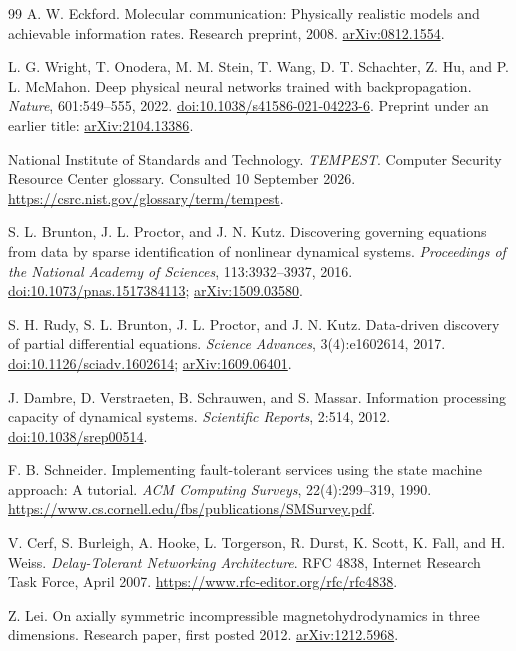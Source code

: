 \documentclass[11pt,a4paper]{article}
\theoremstyle{definition}
\theoremstyle{remark}
\begin{document}
\begin{thebibliography}{99}
A. W. Eckford. Molecular communication: Physically realistic models and achievable information rates. Research preprint, 2008. \href{https://arxiv.org/abs/0812.1554}{arXiv:0812.1554}.

L. G. Wright, T. Onodera, M. M. Stein, T. Wang, D. T. Schachter, Z. Hu, and P. L. McMahon. Deep physical neural networks trained with backpropagation. \emph{Nature}, 601:549--555, 2022. \href{https://doi.org/10.1038/s41586-021-04223-6}{doi:10.1038/s41586-021-04223-6}. Preprint under an earlier title: \href{https://arxiv.org/abs/2104.13386}{arXiv:2104.13386}.

National Institute of Standards and Technology. \emph{TEMPEST}. Computer Security Resource Center glossary. Consulted 10 September 2026. \url{https://csrc.nist.gov/glossary/term/tempest}.

S. L. Brunton, J. L. Proctor, and J. N. Kutz. Discovering governing equations from data by sparse identification of nonlinear dynamical systems. \emph{Proceedings of the National Academy of Sciences}, 113:3932--3937, 2016. \href{https://doi.org/10.1073/pnas.1517384113}{doi:10.1073/pnas.1517384113}; \href{https://arxiv.org/abs/1509.03580}{arXiv:1509.03580}.

S. H. Rudy, S. L. Brunton, J. L. Proctor, and J. N. Kutz. Data-driven discovery of partial differential equations. \emph{Science Advances}, 3(4):e1602614, 2017. \href{https://doi.org/10.1126/sciadv.1602614}{doi:10.1126/sciadv.1602614}; \href{https://arxiv.org/abs/1609.06401}{arXiv:1609.06401}.

J. Dambre, D. Verstraeten, B. Schrauwen, and S. Massar. Information processing capacity of dynamical systems. \emph{Scientific Reports}, 2:514, 2012. \href{https://doi.org/10.1038/srep00514}{doi:10.1038/srep00514}.

F. B. Schneider. Implementing fault-tolerant services using the state machine approach: A tutorial. \emph{ACM Computing Surveys}, 22(4):299--319, 1990. \url{https://www.cs.cornell.edu/fbs/publications/SMSurvey.pdf}.

V. Cerf, S. Burleigh, A. Hooke, L. Torgerson, R. Durst, K. Scott, K. Fall, and H. Weiss. \emph{Delay-Tolerant Networking Architecture}. RFC 4838, Internet Research Task Force, April 2007. \url{https://www.rfc-editor.org/rfc/rfc4838}.

Z. Lei. On axially symmetric incompressible magnetohydrodynamics in three dimensions. Research paper, first posted 2012. \href{https://arxiv.org/abs/1212.5968}{arXiv:1212.5968}.


\end{thebibliography}
\end{document}
